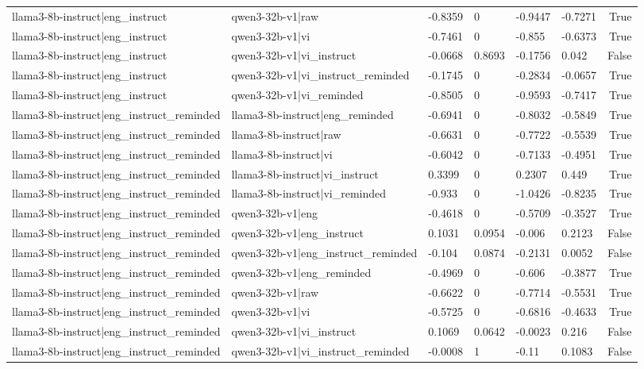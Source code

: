 \begin{table}
\begin{tabular}{llllllr}
llama3-8b-instruct|eng_instruct & qwen3-32b-v1|raw & -0.8359 & 0 & -0.9447 & -0.7271 & True \\
llama3-8b-instruct|eng_instruct & qwen3-32b-v1|vi & -0.7461 & 0 & -0.855 & -0.6373 & True \\
llama3-8b-instruct|eng_instruct & qwen3-32b-v1|vi_instruct & -0.0668 & 0.8693 & -0.1756 & 0.042 & False \\
llama3-8b-instruct|eng_instruct & qwen3-32b-v1|vi_instruct_reminded & -0.1745 & 0 & -0.2834 & -0.0657 & True \\
llama3-8b-instruct|eng_instruct & qwen3-32b-v1|vi_reminded & -0.8505 & 0 & -0.9593 & -0.7417 & True \\
llama3-8b-instruct|eng_instruct_reminded & llama3-8b-instruct|eng_reminded & -0.6941 & 0 & -0.8032 & -0.5849 & True \\
llama3-8b-instruct|eng_instruct_reminded & llama3-8b-instruct|raw & -0.6631 & 0 & -0.7722 & -0.5539 & True \\
llama3-8b-instruct|eng_instruct_reminded & llama3-8b-instruct|vi & -0.6042 & 0 & -0.7133 & -0.4951 & True \\
llama3-8b-instruct|eng_instruct_reminded & llama3-8b-instruct|vi_instruct & 0.3399 & 0 & 0.2307 & 0.449 & True \\
llama3-8b-instruct|eng_instruct_reminded & llama3-8b-instruct|vi_reminded & -0.933 & 0 & -1.0426 & -0.8235 & True \\
llama3-8b-instruct|eng_instruct_reminded & qwen3-32b-v1|eng & -0.4618 & 0 & -0.5709 & -0.3527 & True \\
llama3-8b-instruct|eng_instruct_reminded & qwen3-32b-v1|eng_instruct & 0.1031 & 0.0954 & -0.006 & 0.2123 & False \\
llama3-8b-instruct|eng_instruct_reminded & qwen3-32b-v1|eng_instruct_reminded & -0.104 & 0.0874 & -0.2131 & 0.0052 & False \\
llama3-8b-instruct|eng_instruct_reminded & qwen3-32b-v1|eng_reminded & -0.4969 & 0 & -0.606 & -0.3877 & True \\
llama3-8b-instruct|eng_instruct_reminded & qwen3-32b-v1|raw & -0.6622 & 0 & -0.7714 & -0.5531 & True \\
llama3-8b-instruct|eng_instruct_reminded & qwen3-32b-v1|vi & -0.5725 & 0 & -0.6816 & -0.4633 & True \\
llama3-8b-instruct|eng_instruct_reminded & qwen3-32b-v1|vi_instruct & 0.1069 & 0.0642 & -0.0023 & 0.216 & False \\
llama3-8b-instruct|eng_instruct_reminded & qwen3-32b-v1|vi_instruct_reminded & -0.0008 & 1 & -0.11 & 0.1083 & False \\

\end{tabular}
\end{table}

